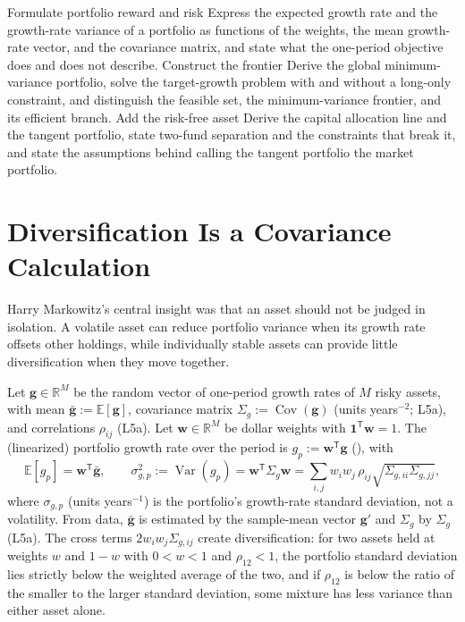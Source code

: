 \documentclass[11pt]{article}
\newcommand{\R}{\mathbb{R}}
\newcommand{\E}{\mathbb{E}}
\newcommand{\Cov}{\operatorname{Cov}}
\newcommand{\Var}{\operatorname{Var}}
\begin{document}

\learningobjectives
  {Formulate portfolio reward and risk}
  {Express the expected growth rate and the growth-rate variance of a portfolio as functions of the weights, the mean growth-rate vector, and the covariance matrix, and state what the one-period objective does and does not describe.}
  {Construct the frontier}
  {Derive the global minimum-variance portfolio, solve the target-growth problem with and without a long-only constraint, and distinguish the feasible set, the minimum-variance frontier, and its efficient branch.}
  {Add the risk-free asset}
  {Derive the capital allocation line and the tangent portfolio, state two-fund separation and the constraints that break it, and state the assumptions behind calling the tangent portfolio the market portfolio.}

\section{Diversification Is a Covariance Calculation}

Harry Markowitz's central insight was that an asset should not be judged in isolation. A volatile asset can reduce portfolio variance when its growth rate offsets other holdings, while individually stable assets can provide little diversification when they move together.

Let $\mathbf g\in\R^M$ be the random vector of one-period growth rates of $M$ risky assets, with mean $\bar{\mathbf g}:=\E[\mathbf g]$, covariance matrix $\Sigma_g:=\Cov(\mathbf g)$ (units years$^{-2}$; L5a), and correlations $\rho_{ij}$ (L5a). Let $\mathbf w\in\R^M$ be dollar weights with $\mathbf1^{\mathsf T}\mathbf w=1$. The (linearized) portfolio growth rate over the period is $g_p:=\mathbf w^{\mathsf T}\mathbf g$ (), with
\begin{equation}
  \label{eq:portfolio-moments}
  \E[g_p]=\mathbf w^{\mathsf T}\bar{\mathbf g},
  \qquad
  \sigma_{g,p}^2:=\Var(g_p)=\mathbf w^{\mathsf T}\Sigma_g\mathbf w
  =\sum_{i,j}w_iw_j\,\rho_{ij}\sqrt{\Sigma_{g,ii}\Sigma_{g,jj}},
\end{equation}
where $\sigma_{g,p}$ (units years$^{-1}$) is the portfolio's growth-rate standard deviation, not a volatility. From data, $\bar{\mathbf g}$ is estimated by the sample-mean vector $\mathbf g'$ and $\Sigma_g$ by $\widehat\Sigma_g$ (L5a). The cross terms $2w_iw_j\Sigma_{g,ij}$ create diversification: for two assets held at weights $w$ and $1-w$ with $0<w<1$ and $\rho_{12}<1$, the portfolio standard deviation lies strictly below the weighted average of the two, and if $\rho_{12}$ is below the ratio of the smaller to the larger standard deviation, some mixture has less variance than either asset alone.
\end{document}
